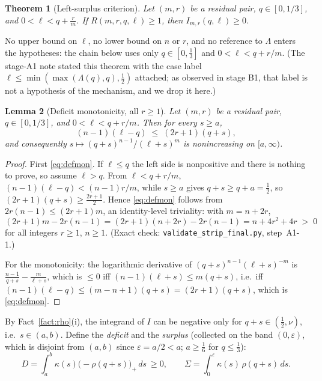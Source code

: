 \documentclass[11pt]{article}
\newtheorem{theorem}{Theorem}[section]
\newtheorem{lemma}[theorem]{Lemma}
\theoremstyle{remark}
\theoremstyle{plain}
\theoremstyle{plain}
\begin{document}
\begin{theorem}[Left-surplus criterion]\label{thm:leftsurplus}
Let $(m,r)$ be a residual pair, $q\in[0,1/3]$, and $0<\ell<q+\tfrac rm$.  If $R(m,r,q,\ell)\ge1$, then $I_{m,r}(q,\ell)\ge0$.
\end{theorem}

No upper bound on $\ell$, no lower bound on $n$ or $r$, and no reference to $\Lambda$ enters the hypotheses: the chain below uses only $q\in[0,\tfrac13]$ and $0<\ell<q+r/m$.  (The stage-A1 note stated this theorem with the case label $\ell\le\min(\max(\Lambda(q),q),\tfrac12)$ attached; as observed in stage B1, that label is not a hypothesis of the mechanism, and we drop it here.)

\begin{lemma}[Deficit monotonicity, all $r\ge1$]\label{lem:defmon}
Let $(m,r)$ be a residual pair, $q\in[0,1/3]$, and $0<\ell<q+r/m$.  Then for every $s\ge a$,
\begin{equation}\label{eq:defmon}
        (n-1)(\ell-q)\;\le\;(2r+1)(q+s),
\end{equation}
and consequently $s\mapsto(q+s)^{n-1}/(\ell+s)^{m}$ is nonincreasing on $[a,\infty)$.
\end{lemma}

\begin{proof}
First \eqref{eq:defmon}.  If $\ell\le q$ the left side is nonpositive and there is nothing to prove, so assume $\ell>q$.  From $\ell<q+r/m$,
$(n-1)(\ell-q)<(n-1)r/m$, while $s\ge a$ gives $q+s\ge q+a=\tfrac12$, so $(2r+1)(q+s)\ge\tfrac{2r+1}{2}$.  Hence \eqref{eq:defmon} follows from
$2r(n-1)\le(2r+1)m$, an identity-level triviality: with $m=n+2r$,
\[
        (2r+1)m-2r(n-1)=(2r+1)(n+2r)-2r(n-1)=n+4r^{2}+4r\;>\;0
\]
for all integers $r\ge1$, $n\ge1$.  (Exact check: \texttt{validate\_strip\_final.py}, step~A1-1.)

For the monotonicity: the logarithmic derivative of $(q+s)^{n-1}(\ell+s)^{-m}$ is $\frac{n-1}{q+s}-\frac{m}{\ell+s}$, which is $\le0$ iff $(n-1)(\ell+s)\le m(q+s)$, i.e.\ iff $(n-1)(\ell-q)\le(m-n+1)(q+s)=(2r+1)(q+s)$, which is \eqref{eq:defmon}.
\end{proof}

By Fact~\ref{fact:rho}(i), the integrand of $I$ can be negative only for $q+s\in(\tfrac12,\nu)$, i.e.\ $s\in(a,b)$.  Define the \emph{deficit} and the \emph{surplus} (collected on the band $(0,\varepsilon)$, which is disjoint from $(a,b)$ since $\varepsilon=a/2<a$; $a\ge\tfrac16$ for $q\le\tfrac13$):
\[
        D=\int_a^b \kappa(s)\bigl(-\rho(q+s)\bigr)_+\,ds\ \ge0,
        \qquad
        \Sigma=\int_0^{\varepsilon}\kappa(s)\,\rho(q+s)\,ds .
\]
\end{document}
